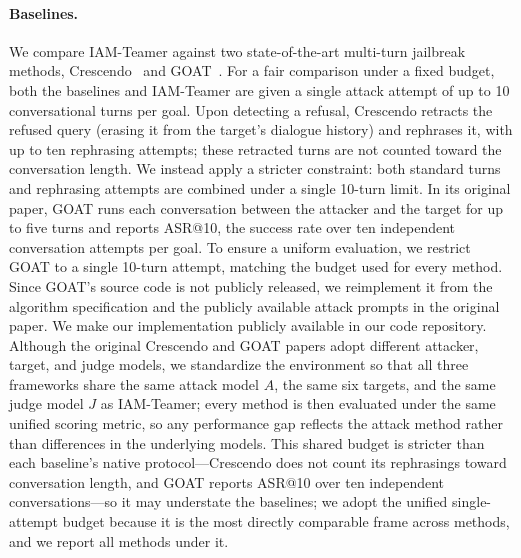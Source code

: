 \paragraph{Baselines.}
We compare IAM-Teamer against two state-of-the-art multi-turn jailbreak methods, Crescendo~\cite{crescendo} and GOAT~\cite{goat}.
For a fair comparison under a fixed budget, both the baselines and IAM-Teamer are given a single attack attempt of up to 10 conversational turns per goal.
Upon detecting a refusal, Crescendo retracts the refused query (erasing it from the target's dialogue history) and rephrases it, with up to ten rephrasing attempts; these retracted turns are not counted toward the conversation length.
We instead apply a stricter constraint: both standard turns and rephrasing attempts are combined under a single 10-turn limit.
In its original paper, GOAT runs each conversation between the attacker and the target for up to five turns and reports ASR@10, the success rate over ten independent conversation attempts per goal.
To ensure a uniform evaluation, we restrict GOAT to a single 10-turn attempt, matching the budget used for every method.
Since GOAT's source code is not publicly released, we reimplement it from the algorithm specification and the publicly available attack prompts in the original paper.
We make our implementation publicly available in our code repository.
Although the original Crescendo and GOAT papers adopt different attacker, target, and judge models, we standardize the environment so that all three frameworks share the same attack model $A$, the same six targets, and the same judge model $J$ as IAM-Teamer; every method is then evaluated under the same unified scoring metric, so any performance gap reflects the attack method rather than differences in the underlying models.
This shared budget is stricter than each baseline's native protocol---Crescendo does not count its rephrasings toward conversation length, and GOAT reports ASR@10 over ten independent conversations---so it may understate the baselines; we adopt the unified single-attempt budget because it is the most directly comparable frame across methods, and we report all methods under it.

